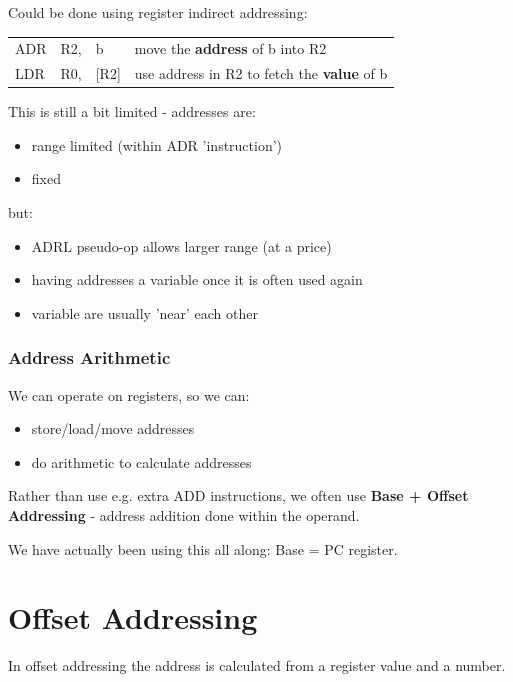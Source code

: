 \documentclass{article}
\begin{document}
Could be done using register indirect addressing:

\begin{center}
    \begin{tabular}{l l l l}
        ADR & R2, & b & move the {\bf address} of b into R2\\
        LDR & R0, & [R2] & use address in R2 to fetch the {\bf value} of b\\
    \end{tabular}
\end{center}

This is still a bit limited - addresses are:

\begin{itemize}
  \item range limited (within ADR 'instruction')
  \item fixed
\end{itemize}

but:

\begin{itemize}
  \item ADRL pseudo-op allows larger range (at a price)
  \item having addresses a variable once it is often used again
  \item variable are usually 'near' each other
\end{itemize}

\subsubsection{Address Arithmetic}
We can operate on registers, so we can:

\begin{itemize}
  \item store/load/move addresses
  \item do arithmetic to calculate addresses
\end{itemize}

Rather than use e.g. extra ADD instructions, we often use {\bf Base + Offset Addressing} - address addition done within the operand.

We have actually been using this all along: Base = PC register.

\section{Offset Addressing}
In offset addressing the address is calculated from a register value and a number.
\end{document}
